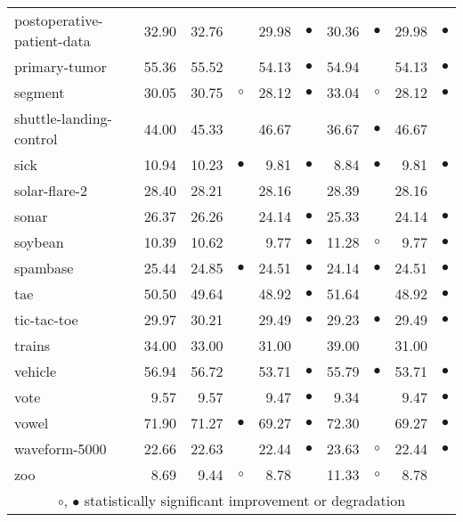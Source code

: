 {\begin{longtable}{lrr@{\hspace{0.1cm}}cr@{\hspace{0.1cm}}cr@{\hspace{0.1cm}}cr@{\hspace{0.1cm}}c}
postoperative-patient-data & 32.90 & 32.76 &           & 29.98 & $\bullet$ & 30.36 &  $\bullet$ & 29.98 & $\bullet$\\
primary-tumor & 55.36 & 55.52 &           & 54.13 & $\bullet$ & 54.94 &            & 54.13 & $\bullet$\\
segment & 30.05 & 30.75 &   $\circ$ & 28.12 & $\bullet$ & 33.04 &    $\circ$ & 28.12 & $\bullet$\\
shuttle-landing-control & 44.00 & 45.33 &           & 46.67 &           & 36.67 &  $\bullet$ & 46.67 &          \\
sick & 10.94 & 10.23 & $\bullet$ &  9.81 & $\bullet$ &  8.84 &  $\bullet$ &  9.81 & $\bullet$\\
solar-flare-2 & 28.40 & 28.21 &           & 28.16 &           & 28.39 &            & 28.16 &          \\
sonar & 26.37 & 26.26 &           & 24.14 & $\bullet$ & 25.33 &            & 24.14 & $\bullet$\\
soybean & 10.39 & 10.62 &           &  9.77 & $\bullet$ & 11.28 &    $\circ$ &  9.77 & $\bullet$\\
spambase & 25.44 & 24.85 & $\bullet$ & 24.51 & $\bullet$ & 24.14 &  $\bullet$ & 24.51 & $\bullet$\\
tae & 50.50 & 49.64 &           & 48.92 & $\bullet$ & 51.64 &            & 48.92 & $\bullet$\\
tic-tac-toe & 29.97 & 30.21 &           & 29.49 & $\bullet$ & 29.23 &  $\bullet$ & 29.49 & $\bullet$\\
trains & 34.00 & 33.00 &           & 31.00 &           & 39.00 &            & 31.00 &          \\
vehicle & 56.94 & 56.72 &           & 53.71 & $\bullet$ & 55.79 &  $\bullet$ & 53.71 & $\bullet$\\
vote &  9.57 &  9.57 &           &  9.47 & $\bullet$ &  9.34 &            &  9.47 & $\bullet$\\
vowel & 71.90 & 71.27 & $\bullet$ & 69.27 & $\bullet$ & 72.30 &            & 69.27 & $\bullet$\\
waveform-5000 & 22.66 & 22.63 &           & 22.44 & $\bullet$ & 23.63 &    $\circ$ & 22.44 & $\bullet$\\
zoo &  8.69 &  9.44 &   $\circ$ &  8.78 &           & 11.33 &    $\circ$ &  8.78 &          \\
\hline
\multicolumn{10}{c}{$\circ$, $\bullet$ statistically significant improvement or degradation}\\
\end{longtable} \footnotesize \par}